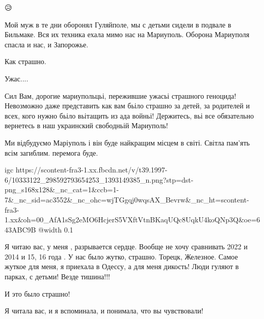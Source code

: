  
 
 
 
 

\qqSecCmt


😥


Мой муж в те дни оборонял Гуляйполе, мы с детьми сидели в подвале в Бильмаке.
Вся их техника ехала мимо нас на Мариуполь. Оборона Мариуполя спасла и нас, и
Запорожье.


Как страшно.


Ужас....


Сил Вам, дорогие мариупольцьі, пережившие ужасьі страшного геноцида! Невозможно
даже представить как вам бьіло страшно за детей, за родителей и всех, кого
нужно бьіло вьітащить из ада войньі! Держитесь, вьі все обязательно вернетесь в
наш украинский свободньій Мариуполь!


Ми відбудуємо Маріуполь і він буде найкращим місцем в світі. Світла пам'ять
всім загиблим. перемога буде.


\ifcmt
  igc https://scontent-fra3-1.xx.fbcdn.net/v/t39.1997-6/10333122_298592793654253_1393149385_n.png?stp=dst-png_s168x128&_nc_cat=1&ccb=1-7&_nc_sid=ac3552&_nc_ohc=wjTGgqj0wqsAX_Bevrw&_nc_ht=scontent-fra3-1.xx&oh=00_AfA1sSg2eMO6HcjerS5VXftVtnBKaqUQc8UqkU4koQNp3Q&oe=643ABC9B
	@width 0.1
\fi


Я читаю вас, у меня , разрывается сердце. Вообще не хочу сравнивать 2022 и 2014
и 15, 16 года . У нас было жутко, страшно. Торецк, Железное. Самое жуткое для
меня, я приехала в Одессу, а для меня дикость! Люди гуляют в парках, с детьми!
Везде тишина!!!

И это было страшно!

Я читала вас, и я вспоминала, и понимала, что вы чувствовали!

